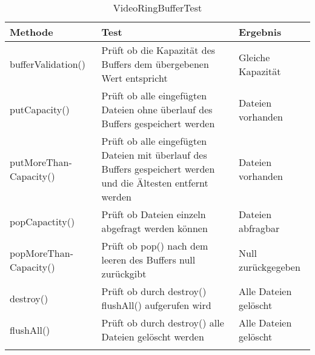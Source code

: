 \begin{longtable}{p{} | p{} | p{}}
\hline
  \textbf{Methode} & \textbf{Test} & \textbf{Ergebnis}\\
  \hline
  bufferValidation() & Prüft ob die Kapazität des Buffers dem übergebenen Wert entspricht & Gleiche Kapazität \\
  \hline
  putCapacity() & Prüft ob alle eingefügten Dateien ohne überlauf des Buffers gespeichert werden & Dateien vorhanden\\
  \hline
  putMoreThan- \newline Capacity() & Prüft ob alle eingefügten Dateien mit überlauf des Buffers gespeichert werden und die Ältesten entfernt werden & Dateien vorhanden\\
  \hline
  popCapactity() & Prüft ob Dateien einzeln abgefragt werden können & Dateien abfragbar \\
  \hline
  popMoreThan- \newline Capacity() & Prüft ob pop() nach dem leeren des Buffers null zurückgibt & Null zurückgegeben\\
  \hline
  destroy() & Prüft ob durch destroy() flushAll() aufgerufen wird & Alle Dateien gelöscht \\
  \hline
  flushAll() & Prüft ob durch destroy() alle Dateien gelöscht werden & Alle Dateien gelöscht \\
  \hline
  \caption{VideoRingBufferTest}
 \end{longtable}
 
